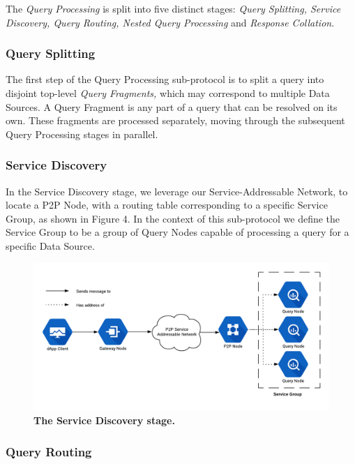 \documentclass[12pt]{article}
\begin{document}
The \textit{Query Processing} is split into five distinct stages: \textit{Query
  Splitting, Service Discovery, Query Routing, Nested Query Processing} and
\textit{Response Collation}.

\subsubsection*{Query Splitting}

The first step of the Query Processing sub-protocol is to split a query into
disjoint top-level \textit{Query Fragments,} which may correspond to multiple
Data Sources. A Query Fragment is any part of a query that can be resolved on
its own. These fragments are processed separately, moving through the subsequent
Query Processing stages in parallel.

\subsubsection*{Service Discovery}

In the Service Discovery stage, we leverage our Service-Addressable Network, to
locate a P2P Node, with a routing table corresponding to a specific Service
Group, as shown in Figure 4. In the context of this sub-protocol we define the
Service Group to be a group of Query Nodes capable of processing a query for a
specific Data Source.

\begin{figure}[H]
  \caption{\textbf{The Service Discovery stage.}}
  \includegraphics[width=1\textwidth]{media/image10.png}
\end{figure}

\subsubsection*{Query Routing}
\end{document}
